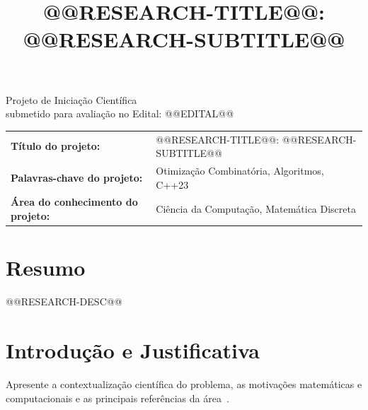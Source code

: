 \documentclass{amsart}
\makeatletter
\newcommand{\numedital}{@@EDITAL@@}
\newcommand{\longtitle}{@@RESEARCH-TITLE@@: @@RESEARCH-SUBTITLE@@}
\makeatother
\begin{document}
\title[@@RESEARCH-TITLE@@]{\longtitle}
\maketitle
\thispagestyle{empty}
\vfill

\begin{flushright}
\begin{minipage}{8cm}
\begin{flushright}
Projeto de Iniciação Científica\\submetido para avaliação no Edital: \numedital
\end{flushright}
\end{minipage}
\end{flushright}

\vfill

\renewcommand{\arraystretch}{2}
\begin{tabular}{ll}
\textbf{Título do projeto:} &
\begin{minipage}[t]{8cm}
\longtitle
\end{minipage}
\\
\textbf{Palavras-chave do projeto:} &
\begin{minipage}[t]{8cm}
Otimização Combinatória, Algoritmos, C++23
\end{minipage}\\
\textbf{Área do conhecimento do projeto:} &
\begin{minipage}[t]{8cm}
Ciência da Computação, Matemática Discreta
\end{minipage}
\end{tabular}
\newpage

\tableofcontents
\newpage

\section{Resumo}
@@RESEARCH-DESC@@

\section{Introdução e Justificativa}
Apresente a contextualização científica do problema, as motivações matemáticas e computacionais e as principais referências da área~\cite{cormen2022introduction, korte2018combinatorial}.
\end{document}
